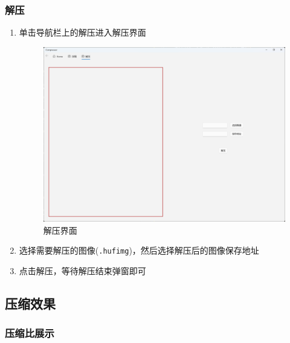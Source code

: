 \documentclass{article}
\begin{document}
\subsubsection{解压}
\begin{enumerate}
    \item 单击导航栏上的解压进入解压界面
    \begin{figure}[H]
        \centering
        \includegraphics[width=0.6\linewidth]{assets/image-4.png}
        \caption{解压界面}
    \end{figure}
    \item 选择需要解压的图像(\texttt{.hufimg})，然后选择解压后的图像保存地址
    \item 点击解压，等待解压结束弹窗即可
\end{enumerate}

\subsection{压缩效果}

\subsubsection{压缩比展示}
\end{document}
